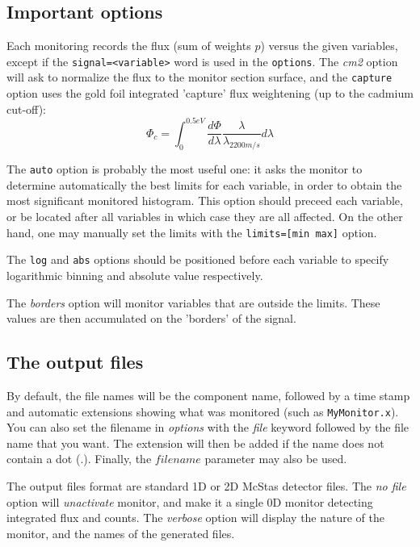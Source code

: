 \subsection{Important options}

Each monitoring records the flux (sum of weights $p$) versus the
given variables, except if the \verb+signal=<variable>+ word is used in the \verb+options+.
The \textit{cm2} option will ask to normalize the flux to the monitor section surface, and the \verb+capture+ option uses the gold foil integrated 'capture' flux weightening (up to the cadmium cut-off):
\begin{equation}
\Phi_c = \int_0^{0.5 eV}{\frac{d\Phi}{d\lambda} \frac{\lambda}{\lambda_{2200 m/s}} d\lambda}
\end{equation}

The \verb+auto+ option is probably the most useful one: it asks the monitor to determine automatically the best limits for each variable, in order to obtain the most significant monitored histogram. This option should preceed each variable, or be located after all variables in which case they are all affected.
On the other hand, one may manually set the limits with the \verb+limits=[min max]+ option.

The \verb+log+ and \verb+abs+ options should be positioned before each variable to specify logarithmic binning and absolute value respectively.

The \textit{borders} option will monitor variables that are outside
the limits. These values are then accumulated on the 'borders' of the
signal.

\subsection{The output files}

By default, the file names will be the component name, followed by a time stamp and
automatic extensions showing what was monitored (such as
\texttt{MyMonitor.x}). You can also set the filename in \textit{options}
with the \textit{file} keyword followed by the file name that you want. The
extension will then be added if the name does not contain a dot (.).
Finally, the $filename$ parameter may also be used.

The output files format are standard 1D or 2D McStas detector files.
The \textit{no file} option will \textit{unactivate} monitor, and make it a
single 0D monitor detecting integrated flux and counts.
The \textit{verbose} option will display the nature of the monitor, and the
names of the generated files.

